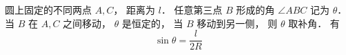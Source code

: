
\begin{issues}
\issueDraft
\end{issues}

圆上固定的不同两点 $A,C$， 距离为 $l$． 任意第三点 $B$ 形成的角 $\angle ABC$ 记为 $\theta$． 当 $B$ 在 $A,C$ 之间移动， $\theta$ 是恒定的， 当 $B$ 移动到另一侧， 则 $\theta$ 取补角． 有
\begin{equation}
\sin\theta = \frac{l}{2R}
\end{equation}
